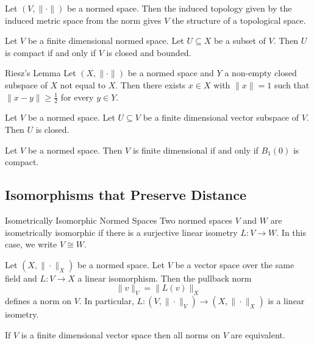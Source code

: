 \documentclass[a4paper]{article}
\begin{document}
\begin{lmm}{}{} Let $(V,\|\cdot\|)$ be a normed space. Then the induced topology given by the induced metric space from the norm gives $V$ the structure of a topological space. 
\end{lmm}

\begin{prp}{}{} Let $V$ be a finite dimensional normed space. Let $U\subseteq X$ be a subset of $V$. Then $U$ is compact if and only if $V$ is closed and bounded. 
\end{prp}

\begin{lmm}{Riesz's Lemma}{} Let $(X,\|\cdot\|)$ be a normed space and $Y$ a non-empty closed subspace of $X$ not equal to $X$. Then there exists $x\in X$ with $\|x\|=1$ such that $\|x-y\|\geq \frac{1}{2}$ for every $y\in Y$. 
\end{lmm}

\begin{prp}{}{} Let $V$ be a normed space. Let $U\subseteq V$ be a finite dimensional vector subspace of $V$. Then $U$ is closed. 
\end{prp}

\begin{prp}{}{} Let $V$ be a normed space. Then $V$ is finite dimensional if and only if $B_1(0)$ is compact. 
\end{prp}

\subsection{Isomorphisms that Preserve Distance}
\begin{defn}{Isometrically Isomorphic Normed Spaces}{} Two normed spaces $V$ and $W$ are isometrically isomorphic if there is a surjective linear isometry $L:V\to W$. In this case, we write $V\cong W$. 
\end{defn}

\begin{prp}{}{} Let $(X,\|\cdot\|_X)$ be a normed space. Let $V$ be a vector space over the same field and $L:V\to X$ a linear isomorphism. Then the pullback norm $$\|v\|_V=\|L(v)\|_X$$ defines a norm on $V$.  In particular, $L:(V,\|\cdot\|_V)\to(X,\|\cdot\|_X)$ is a linear isometry. 
\end{prp}

\begin{thm}{}{} If $V$ is a finite dimensional vector space then all norms on $V$ are equivalent. 
\end{thm}
\end{document}
